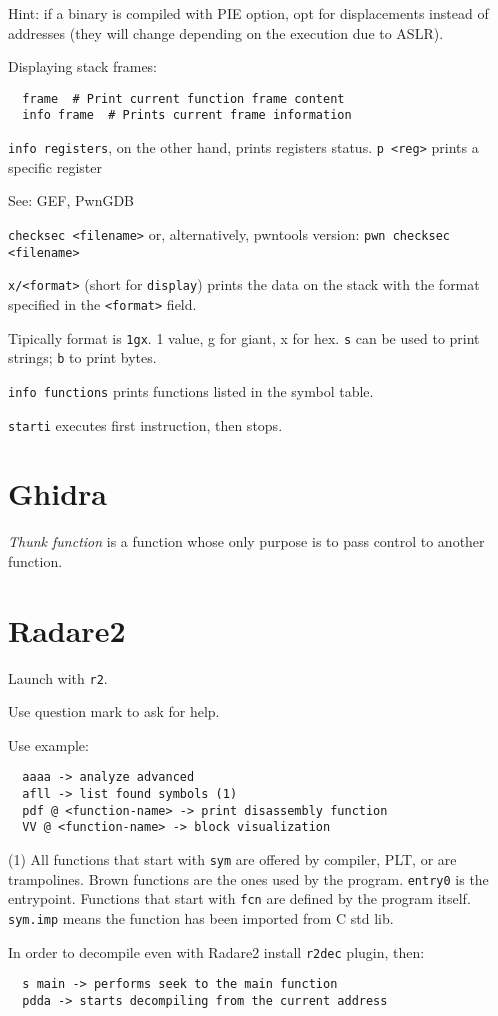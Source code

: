 Hint: if a binary is compiled with PIE option, opt for displacements instead of addresses (they will change depending on the execution due to ASLR).

Displaying stack frames:
\begin{verbatim}
  frame  # Print current function frame content
  info frame  # Prints current frame information
\end{verbatim}

\texttt{info registers}, on the other hand, prints registers status. \texttt{p <reg>} prints a specific register

See: GEF, PwnGDB

\texttt{checksec <filename>} or, alternatively, pwntools version: \texttt{pwn checksec <filename>}

\texttt{x/<format>} (short for \texttt{display}) prints the data on the stack with the format specified in the \texttt{<format>} field.

Tipically format is \texttt{1gx}. 1 value, g for giant, x for hex. \texttt{s} can be used to print strings; \texttt{b} to print bytes.

\texttt{info functions} prints functions listed in the symbol table.

\texttt{starti} executes first instruction, then stops.

\section{Ghidra}
\textit{Thunk function} is a function whose only purpose is to pass control to another function.

\section{Radare2}
Launch with \texttt{r2}.

Use question mark to ask for help.

Use example:
\begin{verbatim}
  aaaa -> analyze advanced
  afll -> list found symbols (1)
  pdf @ <function-name> -> print disassembly function
  VV @ <function-name> -> block visualization
\end{verbatim}

(1) All functions that start with \texttt{sym} are offered by compiler, PLT, or are trampolines.
Brown functions are the ones used by the program. \texttt{entry0} is the entrypoint.
Functions that start with \texttt{fcn} are defined by the program itself.
\texttt{sym.imp} means the function has been imported from C std lib.

In order to decompile even with Radare2 install \texttt{r2dec} plugin, then:
\begin{verbatim}
  s main -> performs seek to the main function
  pdda -> starts decompiling from the current address
\end{verbatim}